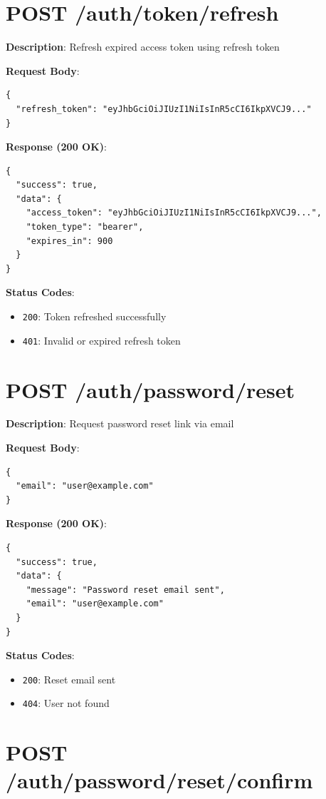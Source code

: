 \documentclass[12pt,a4paper]{report}
\begin{document}
\section{POST /auth/token/refresh}

\textbf{Description}: Refresh expired access token using refresh token

\textbf{Request Body}:
\begin{lstlisting}
{
  "refresh_token": "eyJhbGciOiJIUzI1NiIsInR5cCI6IkpXVCJ9..."
}
\end{lstlisting}

\textbf{Response (200 OK)}:
\begin{lstlisting}
{
  "success": true,
  "data": {
    "access_token": "eyJhbGciOiJIUzI1NiIsInR5cCI6IkpXVCJ9...",
    "token_type": "bearer",
    "expires_in": 900
  }
}
\end{lstlisting}

\textbf{Status Codes}:
\begin{itemize}
    \item \texttt{200}: Token refreshed successfully
    \item \texttt{401}: Invalid or expired refresh token
\end{itemize}

\section{POST /auth/password/reset}

\textbf{Description}: Request password reset link via email

\textbf{Request Body}:
\begin{lstlisting}
{
  "email": "user@example.com"
}
\end{lstlisting}

\textbf{Response (200 OK)}:
\begin{lstlisting}
{
  "success": true,
  "data": {
    "message": "Password reset email sent",
    "email": "user@example.com"
  }
}
\end{lstlisting}

\textbf{Status Codes}:
\begin{itemize}
    \item \texttt{200}: Reset email sent
    \item \texttt{404}: User not found
\end{itemize}

\section{POST /auth/password/reset/confirm}
\end{document}
